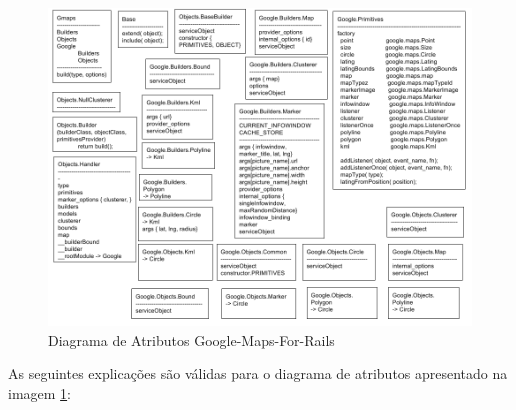 \begin{figure}[ht]
  \begin{center}     
    \includegraphics[scale=0.35]{images/diagrama_de_atributos_google_maps_for_rails.png}
    \caption{Diagrama de Atributos Google-Maps-For-Rails}
    \label{fig:diagrama_de_atributos_google_maps_for_rails}
  \end{center}
\end{figure}

As seguintes explicações são válidas para o diagrama de atributos apresentado na imagem
\ref{fig:diagrama_de_atributos_google_maps_for_rails}:

